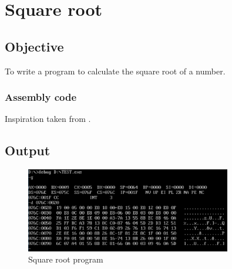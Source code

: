 \section{Square root}

\subsection{Objective}

To write a program to calculate the square root of a number.

\subsubsection{Assembly code}


Inspiration taken from \cite{sqrt}.

\pagebreak
\subsection{Output}

\begin{figure}[ht]
	\centering
	\includegraphics[width=0.8\textwidth]{./res/practicals/sqrt.png}
	\caption{Square root program}
	\label{fig:sqrt}
\end{figure}
